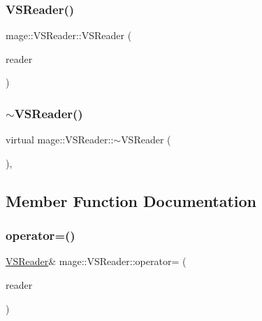 \subsubsection{\texorpdfstring{V\+S\+Reader()}{VSReader()}\hspace{0.1cm}{\footnotesize\ttfamily [3/3]}}
{\footnotesize\ttfamily mage\+::\+V\+S\+Reader\+::\+V\+S\+Reader (\begin{DoxyParamCaption}\item[{\hyperlink{classmage_1_1_v_s_reader}{V\+S\+Reader} \&\&}]{reader }\end{DoxyParamCaption})\hspace{0.3cm}{\ttfamily [delete]}}

\hypertarget{classmage_1_1_v_s_reader_adb1dc76d802501476f1af285fe22369d}{}\label{classmage_1_1_v_s_reader_adb1dc76d802501476f1af285fe22369d} 
\subsubsection{\texorpdfstring{$\sim$\+V\+S\+Reader()}{~VSReader()}}
{\footnotesize\ttfamily virtual mage\+::\+V\+S\+Reader\+::$\sim$\+V\+S\+Reader (\begin{DoxyParamCaption}{ }\end{DoxyParamCaption})\hspace{0.3cm}{\ttfamily [virtual]}, {\ttfamily [default]}}



\subsection{Member Function Documentation}
\hypertarget{classmage_1_1_v_s_reader_ab7d85956947e6b2a28650498573bc055}{}\label{classmage_1_1_v_s_reader_ab7d85956947e6b2a28650498573bc055} 
\subsubsection{\texorpdfstring{operator=()}{operator=()}\hspace{0.1cm}{\footnotesize\ttfamily [1/2]}}
{\footnotesize\ttfamily \hyperlink{classmage_1_1_v_s_reader}{V\+S\+Reader}\& mage\+::\+V\+S\+Reader\+::operator= (\begin{DoxyParamCaption}\item[{const \hyperlink{classmage_1_1_v_s_reader}{V\+S\+Reader} \&}]{reader }\end{DoxyParamCaption})\hspace{0.3cm}{\ttfamily [delete]}}

